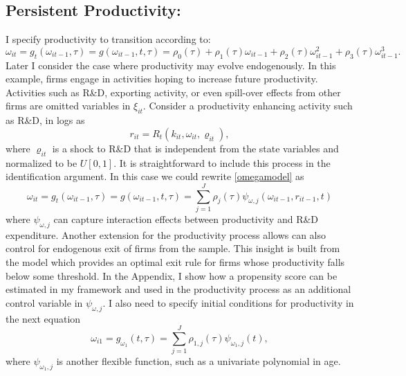 \documentclass{article}
\begin{document}
\subsection*{Persistent Productivity:}
I specify productivity to transition according to:
\begin{equation}\label{omegamodel}
\omega_{it}=g_{t}(\omega_{it-1}, \tau)=g(\omega_{it-1}, t, \tau)=\rho_{0}(\tau)+\rho_{1}(\tau)\omega_{it-1}+\rho_{2}(\tau)\omega^{2}_{it-1}+\rho_{3}(\tau)\omega^{3}_{it-1}.
\end{equation}
Later I consider the case where productivity may evolve endogenously. In this example, firms engage in activities hoping to increase future productivity. Activities such as R\&D, exporting activity, or even spill-over effects from other firms are omitted variables in $\xi_{it}$. Consider a productivity enhancing activity such as R\&D, in logs as
\begin{equation} 
r_{it}=R_{t}(k_{it}, \omega_{it}, \varrho_{it}),
\end{equation}
where $\varrho_{it}$ is a shock to R\&D that is independent from the state variables and normalized to be $U[0,1]$. It is straightforward to include this process in the identification argument. In this case we could rewrite \ref{omegamodel} as
\begin{equation}\label{omegaRDmodel}
\omega_{it}=g_{t}(\omega_{it-1}, \tau)=g(\omega_{it-1}, t, \tau)=\sum_{j=1}^{J}\rho_{j}(\tau)\psi_{\omega,j}(\omega_{it-1}, r_{it-1}, t)
\end{equation}
where $\psi_{\omega,j}$ can capture interaction effects between productivity and R\&D expenditure. Another extension for the productivity process allows can also control for endogenous exit of firms from the sample. This insight is built from the \cite{Olley1996} model which provides an optimal exit rule for firms whose productivity falls below some threshold. In the Appendix, I show how a propensity score can be estimated in my framework and used in the productivity process as an additional control variable in $\psi_{\omega,j}$. I also need to specify initial conditions for productivity in the next equation
\begin{equation}
\label{omega1model}
\omega_{i1}=g_{\omega_{1}}(t, \tau)=\sum_{j=1}^{J}\rho_{1,j}(\tau)\psi_{\omega_{1},j}(t),
\end{equation}
where $\psi_{\omega_{1},j}$ is another flexible function, such as a univariate polynomial in age.
\end{document}
